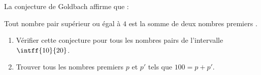 \begin{exo}{}
	La conjecture de Goldbach affirme que :

	\og{} Tout nombre pair supérieur ou égal à $4$ est la somme de deux nombres premiers \fg{}.

	\begin{enumerate}
		\item Vérifier cette conjecture pour tous les nombres pairs de l'intervalle $\intff{10}{20}$.
		\item Trouver tous les nombres premiers $p$ et $p'$ tels que $100 = p + p'$.
	\end{enumerate}
\end{exo}
